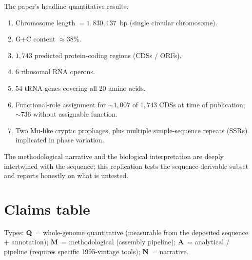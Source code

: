 \documentclass[10pt]{article}
\begin{document}
The paper's headline quantitative results:
\begin{enumerate}[label=(\arabic*)]
  \item Chromosome length $= 1{,}830{,}137$~bp (single circular chromosome).
  \item G+C content $\approx 38\%$.
  \item $1{,}743$ predicted protein-coding regions (CDSs / ORFs).
  \item $6$ ribosomal RNA operons.
  \item $54$ tRNA genes covering all 20 amino acids.
  \item Functional-role assignment for $\sim 1{,}007$ of $1{,}743$ CDSs at time of publication;
    $\sim 736$ without assignable function.
  \item Two Mu-like cryptic prophages, plus multiple simple-sequence repeats (SSRs) implicated
    in phase variation.
\end{enumerate}

The methodological narrative and the biological interpretation are deeply intertwined with the
sequence; this replication tests the sequence-derivable subset and reports honestly on what
is untested.

\section{Claims table}
\label{sec:claims}

Types: \textbf{Q}~= whole-genome quantitative (measurable from the deposited sequence +
annotation); \textbf{M}~= methodological (assembly pipeline); \textbf{A}~= analytical / pipeline
(requires specific 1995-vintage tools); \textbf{N}~= narrative.
\end{document}
